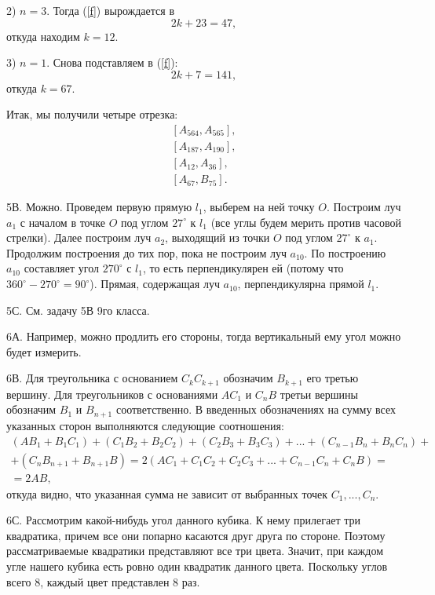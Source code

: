 \documentclass[12pt]{amsart}
\theoremstyle{definition}
\theoremstyle{remark}
\theoremstyle{plain}
\begin{document}
2) $n=3$. Тогда (\ref{f}) вырождается в
$$
2k+23=47,
$$
откуда находим $k=12$.

3) $n=1$. Снова подставляем в (\ref{f}):
$$
2k+7=141,
$$
откуда $k=67$.

Итак, мы получили четыре отрезка:
$$
\begin{array}{l}
[A_{564},A_{565}],\\
\left [A_{187},A_{190}\right ],\\
\left [A_{12},A_{36}\right ],\\
\left [A_{67},B_{75}\right ].
\end{array}
$$

5В. Можно. Проведем первую прямую $l_1$, выберем на ней точку $O$. Построим луч $a_1$ с началом в точке $O$ под углом $27^{\circ}$ к $l_1$ (все углы будем мерить против часовой стрелки). Далее построим луч $a_2$, выходящий из точки $O$ под углом $27^{\circ}$ к $a_1$. Продолжим построения до тих пор, пока не построим луч $a_{10}$. По построению $a_{10}$ составляет угол $270^{\circ}$ с $l_1$, то есть перпендикулярен ей (потому что $360^{\circ}-270^{\circ}=90^{\circ}$). Прямая, содержащая луч $a_{10}$, перпендикулярна прямой $l_1$.

5С. См. задачу 5В 9го класса.

6А. Например, можно продлить его стороны, тогда вертикальный ему угол  можно будет измерить.

6В. Для треугольника с основанием $C_{k}C_{k+1}$ обозначим $B_{k+1}$ его третью вершину. Для треугольников с основаниями $AC_1$ и $C_nB$ третьи вершины обозначим $B_1$ и $B_{n+1}$ соответственно. В введенных обозначениях на сумму всех указанных сторон выполняются следующие соотношения:
$$
\begin{array}{l}
(AB_1+B_1C_1)+(C_1B_2+B_2C_2)+(C_2B_3+B_3C_3)+...+(C_{n-1}B_n+B_nC_n)+\\
+(C_nB_{n+1}+B_{n+1}B)=2(AC_1+C_1C_2+C_2C_3+...+C_{n-1}C_n+C_nB)=\\
=2AB,
\end{array}$$
откуда видно, что указанная сумма не зависит от выбранных точек $C_1,...,C_n$.

6С. Рассмотрим какой-нибудь угол данного кубика. К нему прилегает три квадратика, причем все они попарно касаются друг друга по стороне. Поэтому рассматриваемые квадратики представляют все три цвета. Значит, при каждом угле нашего кубика есть ровно один квадратик данного цвета. Поскольку углов всего 8, каждый цвет представлен 8 раз.
\end{document}

